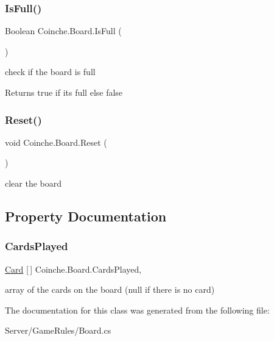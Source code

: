 \subsubsection{\texorpdfstring{Is\+Full()}{IsFull()}}
{\footnotesize\ttfamily Boolean Coinche.\+Board.\+Is\+Full (\begin{DoxyParamCaption}{ }\end{DoxyParamCaption})\hspace{0.3cm}{\ttfamily [inline]}}



check if the board is full 

\begin{DoxyReturn}{Returns}
true if its full else false
\end{DoxyReturn}
\mbox{\label{class_coinche_1_1_board_a5c17c44b33d20c90868cad3b504c4ae4}} 
\subsubsection{\texorpdfstring{Reset()}{Reset()}}
{\footnotesize\ttfamily void Coinche.\+Board.\+Reset (\begin{DoxyParamCaption}{ }\end{DoxyParamCaption})\hspace{0.3cm}{\ttfamily [inline]}}



clear the board 



\subsection{Property Documentation}
\mbox{\label{class_coinche_1_1_board_a06fcff9cacac2e531c446007cece8751}} 
\subsubsection{\texorpdfstring{Cards\+Played}{CardsPlayed}}
{\footnotesize\ttfamily \hyperlink{class_coinche_1_1_card}{Card} \mbox{[}$\,$\mbox{]} Coinche.\+Board.\+Cards\+Played\hspace{0.3cm}{\ttfamily [get]}, {\ttfamily [set]}}



array of the cards on the board (null if there is no card) 



The documentation for this class was generated from the following file\+:\begin{DoxyCompactItemize}
\item 
Server/\+Game\+Rules/Board.\+cs\end{DoxyCompactItemize}
